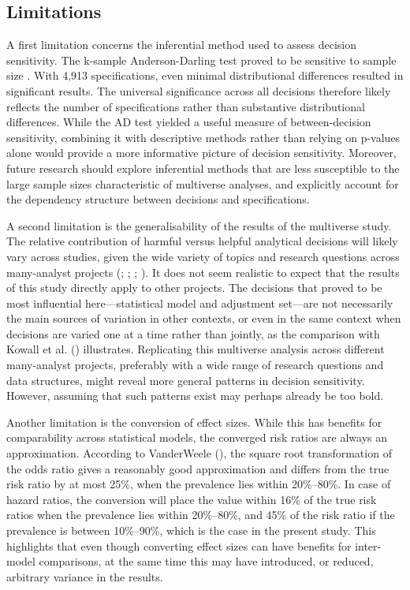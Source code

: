 \documentclass[
  man,
  floatsintext,
  longtable,
  nolmodern,
  notxfonts,
  notimes,
  colorlinks=true,linkcolor=blue,citecolor=blue,urlcolor=blue]{apa7}
\begin{document}
\subsection{Limitations}\label{limitations}

A first limitation concerns the inferential method used to assess
decision sensitivity. The k-sample Anderson-Darling test proved to be
sensitive to sample size . With 4,913 specifications, even minimal
distributional differences resulted in significant results. The
universal significance across all decisions therefore likely reflects
the number of specifications rather than substantive distributional
differences. While the AD test yielded a useful measure of
between-decision sensitivity, combining it with descriptive methods
rather than relying on p-values alone would provide a more informative
picture of decision sensitivity. Moreover, future research should
explore inferential methods that are less susceptible to the large
sample sizes characteristic of multiverse analyses, and explicitly
account for the dependency structure between decisions and
specifications.

A second limitation is the generalisability of the results of the
multiverse study. The relative contribution of harmful versus helpful
analytical decisions will likely vary across studies, given the wide
variety of topics and research questions across many-analyst projects
(;
; ; ). It
does not seem realistic to expect that the results of this study
directly apply to other projects. The decisions that proved to be most
influential here---statistical model and adjustment set---are not
necessarily the main sources of variation in other contexts, or even in
the same context when decisions are varied one at a time rather than
jointly, as the comparison with Kowall et al.
() illustrates. Replicating this
multiverse analysis across different many-analyst projects, preferably
with a wide range of research questions and data structures, might
reveal more general patterns in decision sensitivity. However, assuming
that such patterns exist may perhaps already be too bold.

Another limitation is the conversion of effect sizes. While this has
benefits for comparability across statistical models, the converged risk
ratios are always an approximation. According to VanderWeele
(), the square root
transformation of the odds ratio gives a reasonably good approximation
and differs from the true risk ratio by at most 25\%, when the
prevalence lies within 20\%--80\%. In case of hazard ratios, the
conversion will place the value within 16\% of the true risk ratios when
the prevalence lies within 20\%--80\%, and 45\% of the risk ratio if the
prevalence is between 10\%--90\%, which is the case in the present
study. This highlights that even though converting effect sizes can have
benefits for inter-model comparisons, at the same time this may have
introduced, or reduced, arbitrary variance in the results.
\end{document}
